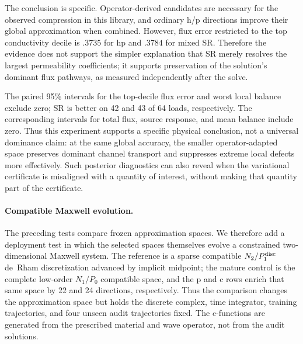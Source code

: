 \documentclass[11pt]{article}
\numberwithin{algorithm}{section}
\theoremstyle{definition}\newtheorem{definition}[theorem]{Definition}
\theoremstyle{remark}\newtheorem{remark}[theorem]{Remark}
\begin{document}
The conclusion is specific.  Operator-derived candidates are necessary for
the observed compression in this library, and ordinary h/p directions improve
their global approximation when combined.  However, flux error restricted to
the top conductivity decile is $.3735$ for hp and $.3784$ for mixed SR.
Therefore the evidence does not support the simpler explanation that SR merely
resolves the largest permeability coefficients; it supports preservation of
the solution's dominant flux pathways, as measured independently after the
solve.

The paired 95\% intervals for the top-decile flux error and worst local
balance exclude zero; SR is better on 42 and 43 of 64 loads, respectively.
The corresponding intervals for total flux, source response, and mean balance
include zero.  Thus this experiment supports a specific physical conclusion,
not a universal dominance claim: at the same global accuracy, the smaller
operator-adapted space preserves dominant channel transport and suppresses
extreme local defects more effectively.  Such posterior diagnostics can also
reveal when the variational certificate is misaligned with a quantity of
interest, without making that quantity part of the certificate.

\paragraph{Compatible Maxwell evolution.}
The preceding tests compare frozen approximation spaces.  We therefore add a
deployment test in which the selected spaces themselves evolve a constrained
two-dimensional Maxwell system.  The reference is a sparse compatible
$N_2/P_1^{\rm disc}$ de~Rham discretization advanced by implicit midpoint;
the mature control is the complete low-order $N_1/P_0$ compatible space, and
the p and c rows enrich that same space by 22 and 24 directions, respectively.
Thus the comparison changes the approximation space but holds the discrete
complex, time integrator, training trajectories, and four unseen audit
trajectories fixed.  The c-functions are generated from the prescribed
material and wave operator, not from the audit solutions.
\end{document}
